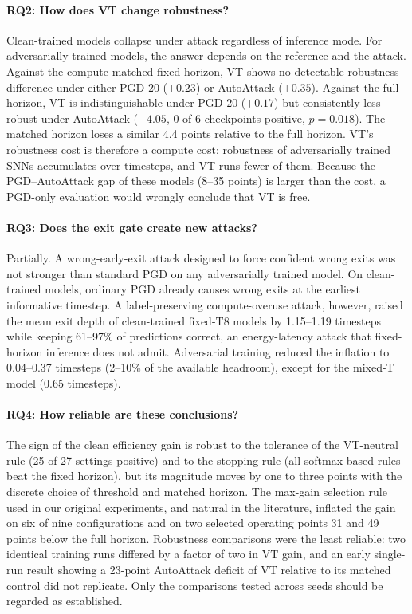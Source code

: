 \paragraph{RQ2: How does VT change robustness?} Clean-trained models collapse under attack regardless of inference mode. For adversarially trained models, the answer depends on the reference and the attack. Against the compute-matched fixed horizon, VT shows no detectable robustness difference under either PGD-20 ($+0.23$) or AutoAttack ($+0.35$). Against the full horizon, VT is indistinguishable under PGD-20 ($+0.17$) but consistently less robust under AutoAttack ($-4.05$, 0 of 6 checkpoints positive, $p = 0.018$). The matched horizon loses a similar 4.4 points relative to the full horizon. VT's robustness cost is therefore a compute cost: robustness of adversarially trained SNNs accumulates over timesteps, and VT runs fewer of them. Because the PGD--AutoAttack gap of these models (8--35 points) is larger than the cost, a PGD-only evaluation would wrongly conclude that VT is free.

\paragraph{RQ3: Does the exit gate create new attacks?} Partially. A wrong-early-exit attack designed to force confident wrong exits was not stronger than standard PGD on any adversarially trained model. On clean-trained models, ordinary PGD already causes wrong exits at the earliest informative timestep. A label-preserving compute-overuse attack, however, raised the mean exit depth of clean-trained fixed-T8 models by 1.15--1.19 timesteps while keeping 61--97\% of predictions correct, an energy-latency attack that fixed-horizon inference does not admit. Adversarial training reduced the inflation to 0.04--0.37 timesteps (2--10\% of the available headroom), except for the mixed-T model (0.65 timesteps).

\paragraph{RQ4: How reliable are these conclusions?} The sign of the clean efficiency gain is robust to the tolerance of the VT-neutral rule (25 of 27 settings positive) and to the stopping rule (all softmax-based rules beat the fixed horizon), but its magnitude moves by one to three points with the discrete choice of threshold and matched horizon. The max-gain selection rule used in our original experiments, and natural in the literature, inflated the gain on six of nine configurations and on two selected operating points 31 and 49 points below the full horizon. Robustness comparisons were the least reliable: two identical training runs differed by a factor of two in VT gain, and an early single-run result showing a 23-point AutoAttack deficit of VT relative to its matched control did not replicate. Only the comparisons tested across seeds should be regarded as established.

